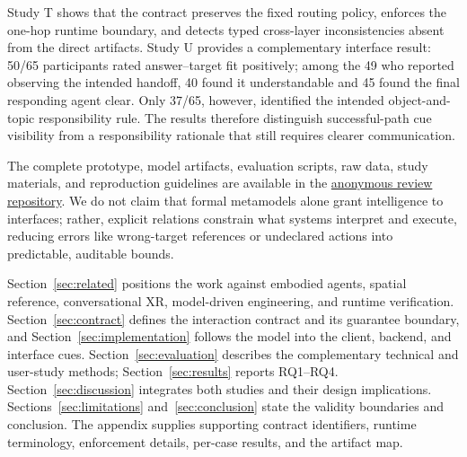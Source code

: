 Study T shows that the contract preserves the fixed routing policy, enforces the
one-hop runtime boundary, and detects typed cross-layer inconsistencies absent
from the direct artifacts. Study U provides a complementary interface result:
50/65 participants rated answer--target fit positively; among the 49 who
reported observing the intended handoff, 40 found it understandable and 45
found the final responding agent clear. Only 37/65, however, identified the
intended object-and-topic responsibility rule. The results therefore distinguish
successful-path cue visibility from a responsibility rationale that still
requires clearer communication.

The complete prototype, model artifacts, evaluation scripts, raw data, study
materials, and reproduction guidelines are available in the
\href{https://anonymous.4open.science/r/FunctionalMLDS-ANON-0F56}{anonymous review repository}.
We do not claim that formal metamodels alone grant intelligence to interfaces;
rather, explicit relations constrain what systems interpret and execute,
reducing errors like wrong-target references or undeclared actions into
predictable, auditable bounds.

Section~\ref{sec:related} positions the work against embodied agents, spatial
reference, conversational XR, model-driven engineering, and runtime
verification. Section~\ref{sec:contract} defines the interaction contract and
its guarantee boundary, and Section~\ref{sec:implementation} follows the model
into the client, backend, and interface cues. Section~\ref{sec:evaluation}
describes the complementary technical and user-study methods; Section~\ref{sec:results}
reports RQ1--RQ4. Section~\ref{sec:discussion} integrates both studies and their
design implications. Sections~\ref{sec:limitations} and~\ref{sec:conclusion}
state the validity boundaries and conclusion. The appendix supplies supporting
contract identifiers, runtime terminology, enforcement details, per-case
results, and the artifact map.
